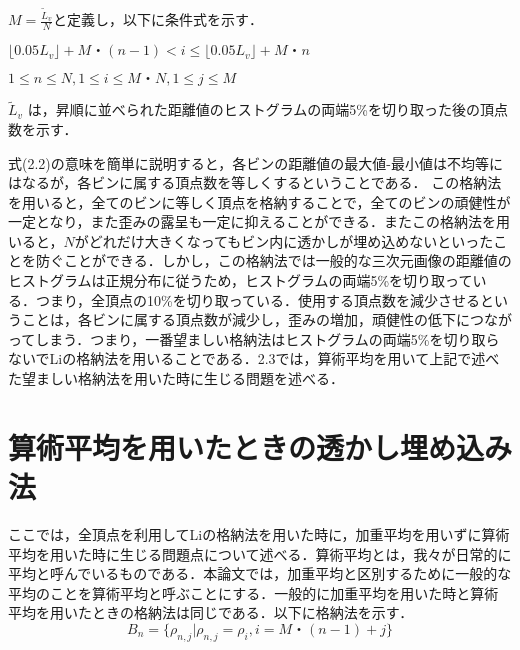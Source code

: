\documentclass[11pt]{jreport}
\begin{document}
{\begin{math}
 M=\frac{\tilde{L}_v}{N}と定義し，以下に条件式を示す．
 \end{math}\par
\begin{center}
\begin{math}
\lfloor 0.05L_v \rfloor+M・(n-1) < i \le \lfloor 0.05L_v \rfloor+M・n
 \end{math}\par
\begin{math}
1\le n \le N,1\le i \le M・N,1 \le j \le M
\end{math}
\end{center}
\begin{math}
\tilde{L}_v
\end{math}
は，昇順に並べられた距離値のヒストグラムの両端5\%を切り取った後の頂点数を示す．\par


式(2.2)の意味を簡単に説明すると，各ビンの距離値の最大値-最小値は不均等にはなるが，各ビンに属する頂点数を等しくするということである．
この格納法を用いると，全てのビンに等しく頂点を格納することで，全てのビンの頑健性が一定となり，また歪みの露呈も一定に抑えることができる．またこの格納法を用いると，\begin{math}N\end{math}がどれだけ大きくなってもビン内に透かしが埋め込めないといったことを防ぐことができる．しかし，この格納法では一般的な三次元画像の距離値のヒストグラムは正規分布に従うため，ヒストグラムの両端5\%を切り取っている．つまり，全頂点の10\%を切り取っている．使用する頂点数を減少させるということは，各ビンに属する頂点数が減少し，歪みの増加，頑健性の低下につながってしまう．つまり，一番望ましい格納法はヒストグラムの両端5\%を切り取らないでLiの格納法を用いることである．2.3では，算術平均を用いて上記で述べた望ましい格納法を用いた時に生じる問題を述べる．



\section{算術平均を用いたときの透かし埋め込み法}
ここでは，全頂点を利用してLiの格納法を用いた時に，加重平均を用いずに算術平均を用いた時に生じる問題点について述べる．算術平均とは，我々が日常的に平均と呼んでいるものである．本論文では，加重平均と区別するために一般的な平均のことを算術平均と呼ぶことにする．一般的に加重平均を用いた時と算術平均を用いたときの格納法は同じである．以下に格納法を示す．
\begin{equation}
B_n=\{{\rho_{n,j}}|\rho_{n,j}=\rho_i,i=M・(n-1)+j\}
\end{equation}

}
\end{document}
